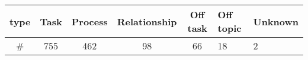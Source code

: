 \begin{tabular}{c|c|c|c|c}
type&Task&Process&Relationship&Off task&Off topic&Unknown\\\hline
\#&755&462&98&66&18&2\\
\end{tabular}
